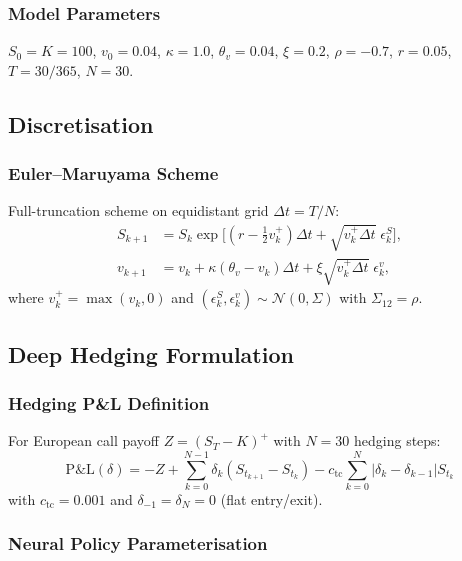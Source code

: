 \subsubsection{Model Parameters}

$S_0 = K = 100$, $v_0 = 0.04$, $\kappa = 1.0$, $\theta_v = 0.04$, $\xi = 0.2$, $\rho = -0.7$, $r = 0.05$, $T = 30/365$, $N = 30$.

\subsection{Discretisation}

\subsubsection{Euler--Maruyama Scheme}

Full-truncation scheme on equidistant grid $\Delta t = T/N$:
\begin{align}
    S_{k+1} &= S_k \exp\!\bigl[(r - \tfrac{1}{2}v_k^+)\Delta t + \sqrt{v_k^+\Delta t}\;\epsilon_k^S\bigr], \\
    v_{k+1} &= v_k + \kappa(\theta_v - v_k)\Delta t + \xi\sqrt{v_k^+\Delta t}\;\epsilon_k^v,
\end{align}
where $v_k^+ = \max(v_k, 0)$ and $(\epsilon_k^S, \epsilon_k^v) \sim \mathcal{N}(0, \Sigma)$ with $\Sigma_{12} = \rho$.

\subsection{Deep Hedging Formulation}

\subsubsection{Hedging P\&L Definition}

For European call payoff $Z = (S_T - K)^+$ with $N = 30$ hedging steps:
\begin{equation}
    \mathrm{P\&L}(\delta) = -Z + \sum_{k=0}^{N-1} \delta_k (S_{t_{k+1}} - S_{t_k}) - c_{\mathrm{tc}} \sum_{k=0}^{N} |\delta_k - \delta_{k-1}| S_{t_k}
\end{equation}
with $c_{\mathrm{tc}} = 0.001$ and $\delta_{-1} = \delta_N = 0$ (flat entry/exit).

\subsubsection{Neural Policy Parameterisation}

